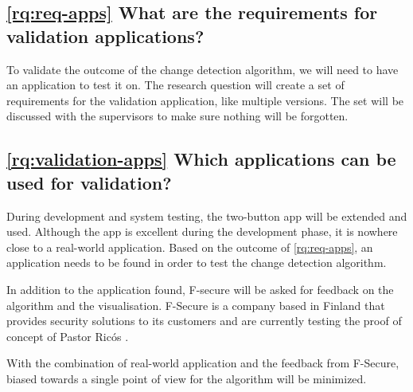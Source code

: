 \subsection{\ref{rq:req-apps} What are the requirements for validation applications?}
To validate the outcome of the change detection algorithm, we will need to have an application to test it on. The research question will create a set of requirements for the validation application, like multiple versions. The set will be discussed with the supervisors to make sure nothing will be forgotten.

\subsection{\ref{rq:validation-apps} Which applications can be used for validation?}
During development and system testing, the two-button app will be extended and used. Although the app is excellent during the development phase, it is nowhere close to a real-world application. Based on the outcome of \ref{rq:req-apps}, an application needs to be found in order to test the change detection algorithm.

In addition to the application found, F-secure will be asked for feedback on the algorithm and the visualisation. F-Secure is a company based in Finland that provides security solutions to its customers and are currently testing the proof of concept of Pastor Ricós \cite{f-secure}.

With the combination of real-world application and the feedback from F-Secure, biased towards a single point of view for the algorithm will be minimized. 